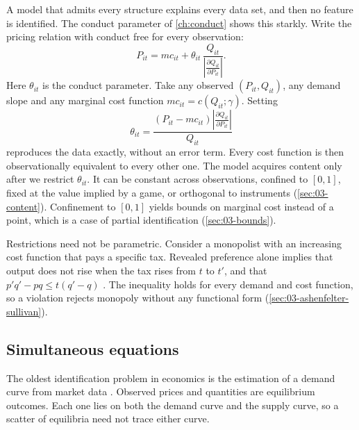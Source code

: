 A model that admits every structure explains every data set, and then no feature is identified. The
conduct parameter of \cref{ch:conduct} shows this starkly. Write the pricing relation with conduct free for
every observation:
\begin{equation}\label{eq:A-free-conduct}
P_{it} = mc_{it} + \theta_{it}\,\frac{Q_{it}}{\left\lvert\frac{\partial Q_{it}}{\partial P_{it}}\right\rvert} .
\end{equation}
Here $\theta_{it}$ is the conduct parameter. Take any observed $(P_{it}, Q_{it})$, any demand slope and any
marginal cost function $mc_{it} = c(Q_{it}; \gamma)$. Setting
\begin{equation*}
\theta_{it} = \frac{(P_{it} - mc_{it})\left\lvert\frac{\partial Q_{it}}{\partial P_{it}}\right\rvert}{Q_{it}}
\end{equation*}
reproduces the data exactly, without an error term. Every cost function is then observationally
equivalent to every other one. The model acquires content only after we restrict $\theta_{it}$. It can be
constant across observations, confined to $[0, 1]$, fixed at the value implied by a game, or orthogonal to
instruments (\cref{sec:03-content}). Confinement to $[0, 1]$ yields bounds on marginal cost instead of a
point, which is a case of partial identification (\cref{sec:03-bounds}).

\begin{remark}\label{rem:A-np-tests}
Restrictions need not be parametric. Consider a monopolist with an increasing cost function that pays a
specific tax. Revealed preference alone implies that output does not rise when the tax rises from $t$ to
$t'$, and that $p'q' - pq \le t(q' - q)$ \citep{AshenfelterSullivan1987}. The inequality holds for every
demand and cost function, so a violation rejects monopoly without any functional form
(\cref{sec:03-ashenfelter-sullivan}).
\end{remark}

\subsection{Simultaneous equations}\label{sec:A-simeq}

The oldest identification problem in economics is the estimation of a demand curve from market data
\citep{Working1927}. Observed prices and quantities are equilibrium outcomes. Each one lies on both the
demand curve and the supply curve, so a scatter of equilibria need not trace either curve.


